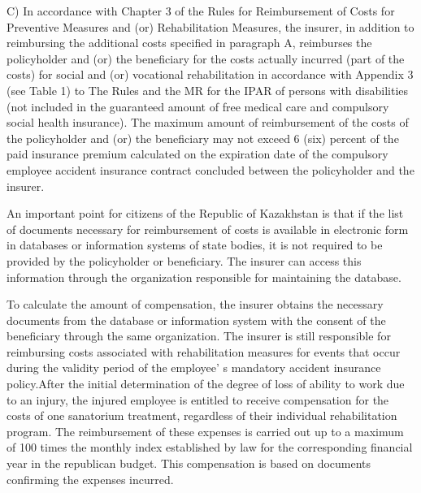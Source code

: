 \begin{multicols}{2}
C) In accordance with Chapter 3 of the Rules for Reimbursement of Costs
for Preventive Measures and (or) Rehabilitation Measures, the insurer,
in addition to reimbursing the additional costs specified in paragraph
A, reimburses the policyholder and (or) the beneficiary for the costs
actually incurred (part of the costs) for social and (or) vocational
rehabilitation in accordance with Appendix 3 (see Table 1) to The Rules
and the MR for the IPAR of persons with disabilities (not included in
the guaranteed amount of free medical care and compulsory social health
insurance). The maximum amount of reimbursement of the costs of the
policyholder and (or) the beneficiary may not exceed 6 (six) percent of
the paid insurance premium calculated on the expiration date of the
compulsory employee accident insurance contract concluded between the
policyholder and the insurer.

An important point for citizens of the Republic of Kazakhstan is that if
the list of documents necessary for reimbursement of costs is available
in electronic form in databases or information systems of state bodies,
it is not required to be provided by the policyholder or beneficiary.
The insurer can access this information through the organization
responsible for maintaining the database.

To calculate the amount of compensation, the insurer obtains the
necessary documents from the database or information system with the
consent of the beneficiary through the same organization. The insurer is
still responsible for reimbursing costs associated with rehabilitation
measures for events that occur during the validity period of the
employee' s mandatory accident insurance policy.After the
initial determination of the degree of loss of ability to work due to an
injury, the injured employee is entitled to receive compensation for the
costs of one sanatorium treatment, regardless of their individual
rehabilitation program. The reimbursement of these expenses is carried
out up to a maximum of 100 times the monthly index established by law
for the corresponding financial year in the republican budget. This
compensation is based on documents confirming the expenses incurred.

\end{multicols}

